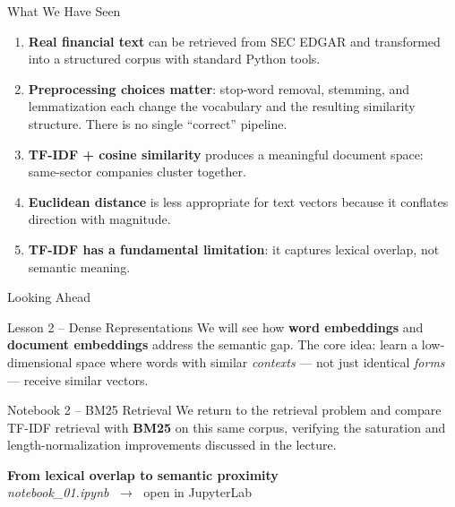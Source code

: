 \documentclass[aspectratio=169,11pt]{beamer}
\begin{document}
\begin{frame}{What We Have Seen}

\begin{enumerate}
  \item \textbf{Real financial text} can be retrieved from
        SEC EDGAR and transformed into a structured corpus
        with standard Python tools.
  \item \textbf{Preprocessing choices matter}: stop-word removal,
        stemming, and lemmatization each change the vocabulary
        and the resulting similarity structure. There is no single
        ``correct'' pipeline.
  \item \textbf{TF-IDF + cosine similarity} produces a meaningful
        document space: same-sector companies cluster together.
  \item \textbf{Euclidean distance} is less appropriate for text
        vectors because it conflates direction with magnitude.
  \item \textbf{TF-IDF has a fundamental limitation}: it captures
        lexical overlap, not semantic meaning.
\end{enumerate}

\end{frame}

\begin{frame}{Looking Ahead}

\begin{block}{Lesson 2 -- Dense Representations}
We will see how \textbf{word embeddings} and
\textbf{document embeddings} address the semantic gap.
The core idea: learn a low-dimensional space where words
with similar \emph{contexts} --- not just identical
\emph{forms} --- receive similar vectors.
\end{block}

\vspace{8pt}
\begin{block}{Notebook 2 -- BM25 Retrieval}
We return to the retrieval problem and compare
TF-IDF retrieval with \textbf{BM25} on this same corpus,
verifying the saturation and length-normalization
improvements discussed in the lecture.
\end{block}

\vspace{8pt}
\begin{center}
\large
\textbf{From lexical overlap to semantic proximity}\\[4pt]
\normalsize
\emph{notebook\_01.ipynb}
$\;\longrightarrow\;$ open in JupyterLab
\end{center}

\end{frame}
\end{document}
